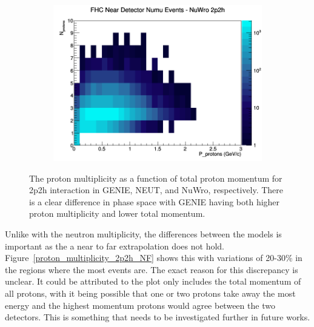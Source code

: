 \documentclass[12pt]{article}
\begin{document}
\begin{figure}[h]
\begin{subfigure}[b]{0.32\textwidth}
\includegraphics[width=\linewidth]{N_P/nominal/protons/2p2h_FHC_ND_numu_N_P_NuWro.png}
\end{subfigure}
\caption{The proton multiplicity as a function of total proton momentum for 2p2h interaction in GENIE, NEUT, and NuWro, respectively. There is a clear difference in phase space with GENIE having both higher proton multiplicity and lower total momentum.}
\label{fig:proton_multiplicity_2p2h}
\end{figure}

Unlike with the neutron multiplicity, the differences between the models is important as the a near to far extrapolation does not hold.  
Figure~\ref{proton_multiplicity_2p2h_NF} shows this with variations of 20-30\% in the regions where the most events are.  
The exact reason for this discrepancy is unclear.
It could be attributed to the plot only includes the total momentum of all protons, with it being possible that one or two protons take away the most energy and the highest momentum protons would agree between the two detectors.
This is something that needs to be investigated further in future works.  
\end{document}
